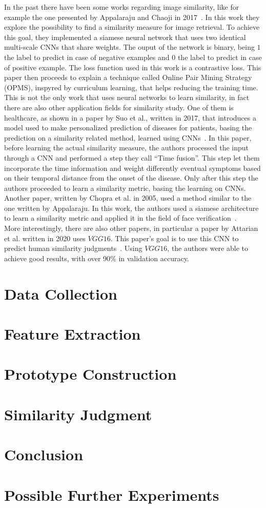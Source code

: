 \documentclass[conference]{IEEEtran}
\begin{document}
			In the past there have been some works regarding image similarity, like for example the one presented by Appalaraju and Chaoji in 2017~\cite{appalaraju2017image}. In this work they explore the possibility to 
			find a similarity measure for image retrieval. To achieve this goal, they implemented a siamese neural network that uses two identical multi-scale CNNs that share weights. The ouput of the 
			network is binary, being $1$ the label to predict in case of negative examples and $0$ the label to predict in case of positive example. The loss function used in this work is a contrastive loss. This paper 
			then proceeds to explain a technique called Online Pair Mining Strategy (OPMS), inspyred by curriculum learning, that helps reducing the training time. \\
			This is not the only work that uses neural networks to learn similarity, in fact there are also other application fields for similarity study. One of them is healthcare, as shown in a paper by Suo et al., written in 
			2017, that introduces a model used to make personalized prediction of diseases for patients, basing the prediction on a similarity related method, learned using CNNs~\cite{8217759}. In this paper, before 
			learning the actual similarity measure, the authors processed the input through a CNN and performed a step they call ``Time fusion''. This step let them incorporate the time information and 
			weight differently eventual symptoms based on their temporal distance from the onset of the disease. Only after this step the authors proceeded to learn a similarity metric, basing the learning 
			on CNNs.\\
			Another paper, written by Chopra et al. in 2005, used a method similar to the one written by Appalaraju. In this work, the authors used a siamese architecture to learn a similarity metric and applied it 
			in the field of face verification~\cite{chopra2005learning}.\\
			More interestingly, there are also other papers, in particular a paper by Attarian et al. written in 2020 uses $VGG16$. This paper's goal is to use this CNN to predict human similarity 
			judgments~\cite{attarian2020transforming}. Using $VGG16$, the authors were able to achieve good results, with over 90\% in validation accuracy.
			
\section{Data Collection}
\section{Feature Extraction}
\section{Prototype Construction}
\section{Similarity Judgment}


\section{Conclusion}
\section{Possible Further Experiments}


\nocite{*}
\printbibliography
\end{document}
